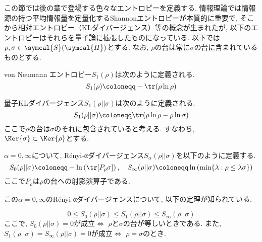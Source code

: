 
この節では後の章で登場する色々なエントロピーを定義する. 
情報理論では情報源の持つ平均情報量を定量化するShannonエントロピーが本質的に重要で, そこから相対エントロピー（KLダイバージェンス）等の概念が生まれたが, 以下のエントロピーはそれらを量子論に拡張したものになっている. 
以下では$\rho, \sigma\in\symcal{S}(\symcal{H})$とする. 
なお, $\rho$の台は常に$\sigma$の台に含まれているものとする. 



\begin{mydfn}\label{dfn.vonNeumannEntropy}
  von Neumann エントロピー$S_1(\rho)$は次のように定義される. 
  \begin{equation}
    S_1(\rho)\coloneqq -\tr(\rho\ln{\rho})
  \end{equation}
\end{mydfn}

\begin{mydfn}[量子KLダイバージェンス]\label{dfn.KLdiv}
  量子KLダイバージェンス$S_1(\rho||\sigma)$は次のように定義される. 
  \begin{equation}
    S_1(\rho||\sigma)\coloneqq \tr(\rho\ln{\rho}-\rho\ln{\sigma})
  \end{equation}
  ここで$\rho$の台は$\sigma$のそれに包含されていると考える. 
  すなわち, $\Ker{\sigma}\subset \Ker{\rho}$とする.
\end{mydfn}

\begin{mydfn}\label{dfn.Renyi-alpha-div}
  $\alpha=0, \infty$について, R\'{e}nyi-αダイバージェンス$S_{\alpha}(\rho||\sigma)$を以下のように定義する. 
  \begin{equation}
    S_{0}(\rho||\sigma)\coloneqq -\ln\left( \tr[P_{\rho}\sigma] \right), \quad S_{\infty}(\rho||\sigma)\coloneqq \ln\left( \min\{\lambda: \rho\leq \lambda\sigma\} \right)
  \end{equation}
  ここで$P_{\rho}$は$\rho$の台への射影演算子である. 
\end{mydfn}

この$\alpha=0, \infty$のR\'{e}nyi-αダイバージェンスについて, 以下の定理が知られている. 

\begin{mythm}\label{thm.Renyi-alpha-div_alpha-increasing}
  \begin{equation}
    0\leq S_0(\rho||\sigma)\leq S_1(\rho||\sigma)\leq S_\infty(\rho||\sigma)
  \end{equation}
  ここで, $S_0(\rho||\sigma)=0$が成立$\iff$ $\rho$と$\sigma$の台が等しいときである. 
  また, $S_1(\rho||\sigma)=S_\infty(\rho||\sigma)=0$が成立$\iff$ $\rho=\sigma$のとき. 
\end{mythm}

